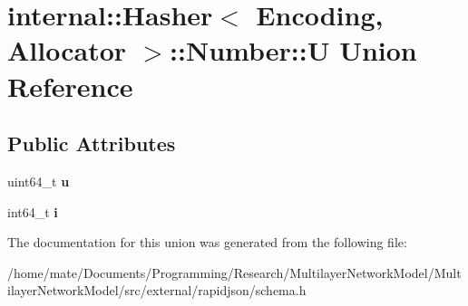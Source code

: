 \hypertarget{unioninternal_1_1Hasher_1_1Number_1_1U}{}\section{internal\+:\+:Hasher$<$ Encoding, Allocator $>$\+:\+:Number\+:\+:U Union Reference}
\label{unioninternal_1_1Hasher_1_1Number_1_1U}
\subsection*{Public Attributes}
\begin{DoxyCompactItemize}
\item 
uint64\+\_\+t {\bfseries u}\hypertarget{unioninternal_1_1Hasher_1_1Number_1_1U_a6380a48b72a4bb5dd7291d47814e6421}{}\label{unioninternal_1_1Hasher_1_1Number_1_1U_a6380a48b72a4bb5dd7291d47814e6421}

\item 
int64\+\_\+t {\bfseries i}\hypertarget{unioninternal_1_1Hasher_1_1Number_1_1U_a19099b91768e67f02ed5a27fc157974b}{}\label{unioninternal_1_1Hasher_1_1Number_1_1U_a19099b91768e67f02ed5a27fc157974b}

\end{DoxyCompactItemize}


The documentation for this union was generated from the following file\+:\begin{DoxyCompactItemize}
\item 
/home/mate/\+Documents/\+Programming/\+Research/\+Multilayer\+Network\+Model/\+Multilayer\+Network\+Model/src/external/rapidjson/schema.\+h\end{DoxyCompactItemize}
